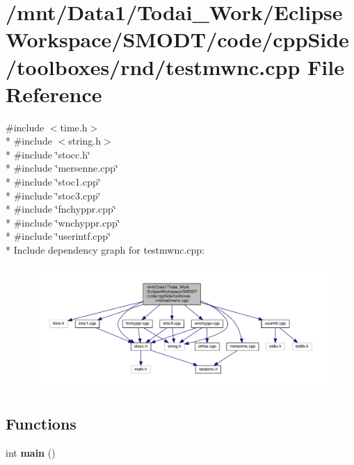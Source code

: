 \section{/mnt/\-Data1/\-Todai\-\_\-\-Work/\-Eclipse\-Workspace/\-S\-M\-O\-D\-T/code/cpp\-Side/toolboxes/rnd/testmwnc.cpp File Reference}
\label{toolboxes_2rnd_2testmwnc_8cpp}
{\ttfamily \#include $<$time.\-h$>$}\\*
{\ttfamily \#include $<$string.\-h$>$}\\*
{\ttfamily \#include \char`\"{}stocc.\-h\char`\"{}}\\*
{\ttfamily \#include \char`\"{}mersenne.\-cpp\char`\"{}}\\*
{\ttfamily \#include \char`\"{}stoc1.\-cpp\char`\"{}}\\*
{\ttfamily \#include \char`\"{}stoc3.\-cpp\char`\"{}}\\*
{\ttfamily \#include \char`\"{}fnchyppr.\-cpp\char`\"{}}\\*
{\ttfamily \#include \char`\"{}wnchyppr.\-cpp\char`\"{}}\\*
{\ttfamily \#include \char`\"{}userintf.\-cpp\char`\"{}}\\*
Include dependency graph for testmwnc.\-cpp\-:
\nopagebreak
\begin{figure}[H]
\begin{center}
\leavevmode
\includegraphics[width=350pt]{toolboxes_2rnd_2testmwnc_8cpp__incl}
\end{center}
\end{figure}
\subsection*{Functions}
\begin{DoxyCompactItemize}
\item 
int {\bf main} ()
\end{DoxyCompactItemize}

